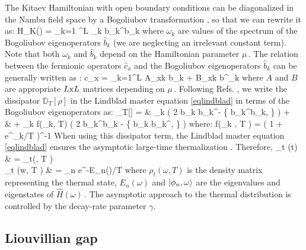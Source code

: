 The Kitaev Hamiltonian with open boundary conditions can be diagonalized 
in the Nambu field space by a Bogoliubov transformation \cite{dr2021self, PF70, bla86},
so that we can rewrite it as:
	\hat H_K(\omega)  = \sum_{k=1} ^L \omega_k \hat b_k^\dagger \hat b_k  \cm
\ea
where $\omega_k$ are values of the spectrum of the Bogoliubov eigenoperators $\hat b_k$
(we are neglecting an irrelevant constant term). Note that both $\omega_k$ and 
$\hat b_k$ depend on the Hamiltonian parameter $\mu\,$. The relation between the
fermionic operators $\hat c_x$ and the Bogoliubov eigenoperators 
$\hat b_k$ can be generally written as \cite{dr2021self, PF70, bla86}:
	\hat c_x = \sum_{k=1}^L A_{xk} \hat b_k + B_{xk} \hat b^\dagger _k \cm
\ea
where $A$ and $B$ are appropriate $L{\rm x}L$ matrices depending on $\mu\,$.
Following Refs. \cite{dr2021self, CPR-2022-otto_engine}, we write the dissipator
$\mathbb{D}_T[\rho]$ in the Lindblad master equation \eqref{eqlindblad} in terms of
the Bogoliubov eigenoperators as:
	_T[\rho] = & \gamma \sum_k  
		\bigl( 2 \hat b_k \rho \hat b_k^\dagger -
			\{ \hat b_k^\dagger \hat b_k, \rho \} \bigl) + \\
		& + \gamma \sum _k f(\omega_k, T) \bigl( 2 \hat b_k^\dagger \rho \hat b_k -
                        \{ \hat b_k \hat b_k^\dagger, \rho \} \bigl) \cm
\ea
where:
	f(\omega_k , T ) = \bigl( 1 + e^{\omega_k/T} \bigl)^{-1} \pt
\ee
When using this dissipator term, the Lindblad master equation 
\eqref{eqlindblad} ensures the asymptotic large-time thermalization \cite{dr2021self}.
Therefore,
	\lim_{t \to \infty} \rho(t) & = \rho_t(\omega, T ) \cm \\
	\rho_t (w, T ) &  = \sum_n e^{-E_n(\omega)/T}  
					 \cm
\ea
where $\rho_t(\omega,T)$ is the density matrix representing the
thermal state, $E_n (\omega)$ and $\ket{\phi_n, \omega}$ are the eigenvalues
and eigenstates of $\hat H(\omega)\,$. The asymptotic approach to
the thermal distribution is controlled by the decay-rate parameter $\gamma$.

\subsection{Liouvillian gap}

